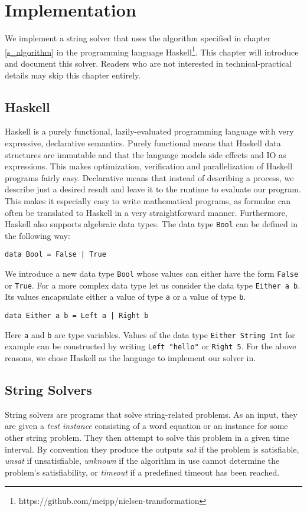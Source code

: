 \chapter{Implementation} \label{ch_implementation}

We implement a string solver that uses the algorithm specified in chapter \ref{s_algorithm} in the programming language Haskell\footnote{https://github.com/meipp/nielsen-transformation}.
This chapter will introduce and document this solver. Readers who are not interested in technical-practical details may skip this chapter entirely.

\section{Haskell}
Haskell \cite{marlow2010haskell} is a purely functional, lazily-evaluated programming language with very expressive, declarative semantics. Purely functional means that Haskell data structures are immutable and that the language models side effects and IO as expressions. This makes optimization, verification and parallelization of Haskell programs fairly easy. Declarative means that instead of describing a process, we describe just a desired result and leave it to the runtime to evaluate our program. This makes it especially easy to write mathematical programs, as formulae can often be translated to Haskell in a very straightforward manner. Furthermore, Haskell also supports algebraic data types. The data type \texttt{Bool} can be defined in the following way:
\begin{verbatim}
data Bool = False | True
\end{verbatim}
We introduce a new data type \texttt{Bool} whose values can either have the form \texttt{False} or \texttt{True}. For a more complex data type let us consider the data type \texttt{Either a b}. Its values encapsulate either a value of type \texttt{a} or a value of type \texttt{b}.
\begin{verbatim}
data Either a b = Left a | Right b
\end{verbatim}
Here \texttt{a} and \texttt{b} are type variables. Values of the data type \texttt{Either String Int} for example can be constructed by writing \texttt{Left "hello"} or \texttt{Right 5}. For the above reasons, we chose Haskell as the language to implement our solver in.

\section{String Solvers}
String solvers are programs that solve string-related problems. As an input, they are given a \textit{test instance} consisting of a word equation or an instance for some other string problem. They then attempt to solve this problem in a given time interval. By convention they produce the outputs \textit{sat} if the problem is satisfiable, \textit{unsat} if unsatisfiable, \textit{unknown} if the algorithm in use cannot determine the problem's satisfiability, or \textit{timeout} if a predefined timeout has been reached.

